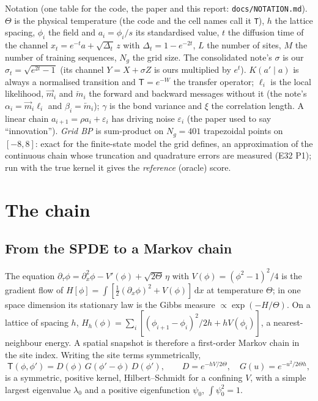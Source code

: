\documentclass[10pt,a4paper]{article}
\newcommand{\Th}{\Theta}
\newcommand{\code}[1]{\texttt{\small #1}}
\newcommand{\dd}{\,\mathrm{d}}
\theoremstyle{plain}
\theoremstyle{remark}
\begin{document}
Notation (one table for the code, the paper and this report: \code{docs/NOTATION.md}). $\Th$ is the physical
temperature (the code and the cell names call it \code{T}), $h$ the lattice spacing, $\phi_i$ the field and
$a_i=\phi_i/s$ its standardised value, $t$ the diffusion time of the channel $x_t=e^{-t}a+\sqrt{\Delta_t}\,z$ with
$\Delta_t=1-e^{-2t}$, $L$ the number of sites, $M$ the number of training sequences, $N_g$ the grid size. The
consolidated note's $\sigma$ is our $\sigma_t=\sqrt{e^{2t}-1}$ (its channel $Y=X+\sigma Z$ is ours multiplied by
$e^{t}$). $K(a'\mid a)$ is always a normalised transition and $\mathsf T=e^{-W}$ the transfer operator; $\ell_i$ is
the local likelihood, $\overrightarrow m_i$ and $\overleftarrow m_i$ the forward and backward messages without it
(the note's $\alpha_i=\overrightarrow m_i\ell_i$ and $\beta_i=\overleftarrow m_i$); $\gamma$ is the bond variance
and $\xi$ the correlation length. A linear chain $a_{i+1}=\rho a_i+\varepsilon_i$ has driving noise $\varepsilon_i$
(the paper used to say ``innovation''). \emph{Grid BP} is sum-product on $N_g=401$ trapezoidal points on $[-8,8]$:
exact for the finite-state model the grid defines, an approximation of the continuous chain whose truncation and
quadrature errors are measured (E32 P1); run with the true kernel it gives the \emph{reference} (oracle) score.

\section{The chain}\label{sec:chain}

\subsection{From the SPDE to a Markov chain}

The equation $\partial_\tau\phi=\partial_x^2\phi-V'(\phi)+\sqrt{2\Th}\,\eta$ with $V(\phi)=(\phi^2-1)^2/4$
is the gradient flow of $H[\phi]=\int[\tfrac12(\partial_x\phi)^2+V(\phi)]\dd x$ at temperature
$\Th$; in one space dimension its stationary law is the Gibbs measure $\propto\exp(-H/\Th)$. On a
lattice of spacing $h$, $H_h(\phi)=\sum_i[(\phi_{i+1}-\phi_i)^2/2h+hV(\phi_i)]$, a nearest-neighbour
energy. A spatial snapshot is therefore a first-order Markov chain in the site index. Writing the
site terms symmetrically,
\begin{equation}
  \mathsf T(\phi,\phi')=D(\phi)\,G(\phi'-\phi)\,D(\phi'),\qquad
  D=e^{-hV/2\Th},\quad G(u)=e^{-u^2/2\Th h},
  \label{eq:T}
\end{equation}
is a symmetric, positive kernel, Hilbert--Schmidt for a confining $V$, with a simple largest
eigenvalue $\lambda_0$ and a positive eigenfunction $\psi_0$, $\int\psi_0^2=1$.
\end{document}
